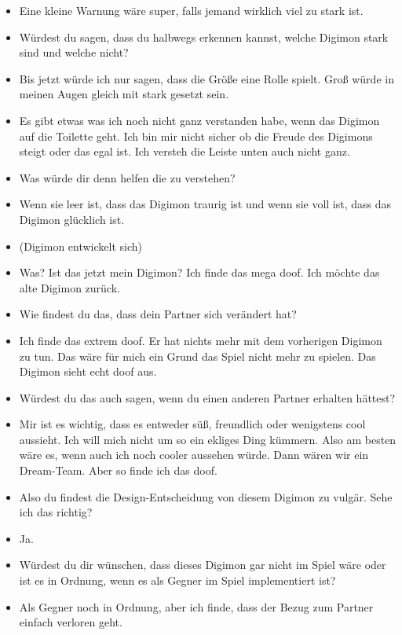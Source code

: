 {\begin{itemize}[]
    \item {} Eine kleine Warnung wäre super, falls jemand wirklich viel zu stark ist. 
    \item {} Würdest du sagen, dass du halbwegs erkennen kannst, welche Digimon stark sind und welche nicht?
    \item {} Bis jetzt würde ich nur sagen, dass die Größe eine Rolle spielt. Groß würde in meinen Augen gleich mit stark gesetzt sein.
    \item {} Es gibt etwas was ich noch nicht ganz verstanden habe, wenn das Digimon auf die Toilette geht. Ich bin mir nicht sicher ob die Freude des Digimons steigt oder das egal ist. Ich versteh die Leiste unten auch nicht ganz.
    \item {} Was würde dir denn helfen die zu verstehen?
    \item {} Wenn sie leer ist, dass das Digimon traurig ist und wenn sie voll ist, dass das Digimon glücklich ist.
    \item {} (Digimon entwickelt sich)
    \item {} Was? Ist das jetzt mein Digimon? Ich finde das mega doof. Ich möchte das alte Digimon zurück.
    \item {} Wie findest du das, dass dein Partner sich verändert hat?
    \item {} Ich finde das extrem doof. Er hat nichts mehr mit dem vorherigen Digimon zu tun. Das wäre für mich ein Grund das Spiel nicht mehr zu spielen. Das Digimon sieht echt doof aus.
    \item {} Würdest du das auch sagen, wenn du einen anderen Partner erhalten hättest?
    \item {} Mir ist es wichtig, dass es entweder süß, freundlich oder wenigstens cool aussieht. Ich will mich nicht um so ein ekliges Ding kümmern. Also am besten wäre es, wenn auch ich noch cooler aussehen würde. Dann wären wir ein Dream-Team. Aber so finde ich das doof. 
    \item {} Also du findest die Design-Entscheidung von diesem Digimon zu vulgär. Sehe ich das richtig?
    \item {} Ja.
    \item {} Würdest du dir wünschen, dass dieses Digimon gar nicht im Spiel wäre oder ist es in Ordnung, wenn es als Gegner im Spiel implementiert ist?
    \item {} Als Gegner noch in Ordnung, aber ich finde, dass der Bezug zum Partner einfach verloren geht.

\end{itemize}}
